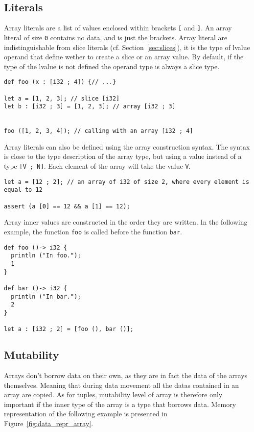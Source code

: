\subsection {Literals}

Array literals are a list of values enclosed within brackets \texttt{[} and
  \texttt{]}. An array literal of size \texttt{0} contains no data, and is just
the brackets. Array literal are indistinguishable from slice literals (cf.
Section~\ref{sec:slices}), it is the type of lvalue operand that define wether
to create a slice or an array value. By default, if the type of the lvalue is
not defined the operand type is always a slice type.

\begin{lstlisting}[style=coloredverbatim]
def foo (x : [i32 ; 4]) {// ...}

let a = [1, 2, 3]; // slice [i32]
let b : [i32 ; 3] = [1, 2, 3]; // array [i32 ; 3]


foo ([1, 2, 3, 4]); // calling with an array [i32 ; 4]
\end{lstlisting}

Array literals can also be defined using the array construction syntax. The
syntax is close to the type description of the array type, but using a value
instead of a type \texttt{[V ; N]}. Each element of the array will take the
value \texttt{V}.

\begin{lstlisting}[style=coloredverbatim]
let a = [12 ; 2]; // an array of i32 of size 2, where every element is equal to 12

assert (a [0] == 12 && a [1] == 12);
\end{lstlisting}

Array inner values are constructed in the order they are written. In the
following example, the function \texttt{foo} is called before the function
\texttt{bar}.

\begin{lstlisting}[style=coloredverbatim]
def foo ()-> i32 {
  println ("In foo.");
  1
}

def bar ()-> i32 {
  println ("In bar.");
  2
}

let a : [i32 ; 2] = [foo (), bar ()];
\end{lstlisting}

\subsection {Mutability}

Arrays don't borrow data on their own, as they are in fact the data of the
arrays themselves. Meaning that during data movement all the datas contained in
an array are copied. As for tuples, mutability level of array is therefore only
important if the inner type of the array is a type that borrows data. Memory
representation of the following example is presented in
Figure~\ref{fig:data_repr_array}.

